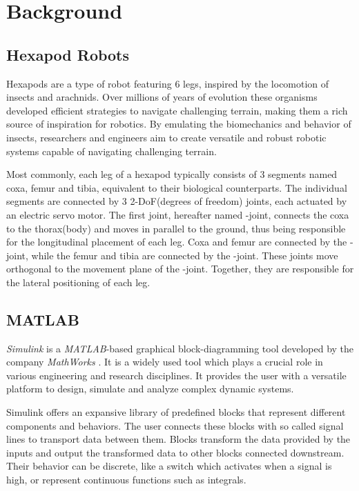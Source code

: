\chapter{Background}
\label{ch:background}

\section{Hexapod Robots}
Hexapods are a type of robot featuring 6 legs, inspired by the locomotion of insects and arachnids.
Over millions of years of evolution these organisms developed efficient strategies to navigate challenging terrain, making them a rich source of inspiration for robotics.
By emulating the biomechanics and behavior of insects, researchers and engineers aim to create versatile and robust robotic systems capable of navigating challenging terrain.

Most commonly, each leg of a hexapod typically consists of 3 segments named coxa, femur and tibia, equivalent to their biological counterparts.
The individual segments are connected by 3 2-DoF(degrees of freedom) joints, each actuated by an electric servo motor.
The first joint, hereafter named \textalpha-joint, connects the coxa to the thorax(body) and moves in parallel to the ground, thus being responsible for the longitudinal placement of each leg.
Coxa and femur are connected by the \textbeta-joint, while the femur and tibia are connected by the \textgamma-joint. 
These joints move orthogonal to the movement plane of the \textalpha-joint. Together, they are responsible for the lateral positioning of each leg.





\section{MATLAB}
\textit{Simulink\textsuperscript{\textregistered}} is a \textit{MATLAB\textsuperscript{\textregistered}}-based graphical block-diagramming tool developed by the company \textit{MathWorks\textsuperscript{\textregistered}} .
It is a widely used tool which plays a crucial role in various engineering and research disciplines.
It provides the user with a versatile platform to design, simulate and analyze complex dynamic systems.

Simulink offers an expansive library of predefined blocks that represent different components and behaviors.
The user connects these blocks with so called signal lines to transport data between them.
Blocks transform the data provided by the inputs and output the transformed data to other blocks connected downstream.
Their behavior can be discrete, like a switch which activates when a signal is high, or represent continuous functions such as integrals.

